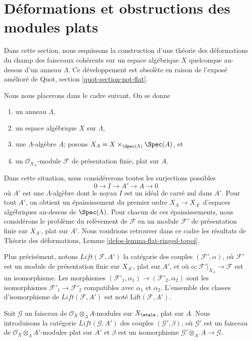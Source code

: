 \section{D\'eformations et obstructions des modules plats}
\label{section-modules}

\noindent
Dans cette section, nous esquissons la construction d'une th\'eorie des
d\'eformations du champ des faisceaux coh\'erents sur un espace alg\'ebrique
$X$ quelconque au-dessus d'un anneau $\Lambda$. Ce d\'eveloppement est
obsol\`ete en raison de l'expos\'e am\'elior\'e de
Quot, section \ref{quot-section-not-flat}.

\medskip\noindent
Nous nous placerons dans le cadre suivant. On se donne
\begin{enumerate}
\item un anneau $\Lambda$,
\item un espace alg\'ebrique $X$ sur $\Lambda$,
\item une $\Lambda$-alg\`ebre $A$; posons
$X_A = X \times_{\Spec(\Lambda)} \Spec(A)$, et
\item un $\mathcal{O}_{X_A}$-module $\mathcal{F}$ de pr\'esentation finie,
plat sur $A$.
\end{enumerate}
Dans cette situation, nous consid\'ererons toutes les surjections possibles
$$
0 \to I \to A' \to A \to 0
$$
o\`u $A'$ est une $\Lambda$-alg\`ebre dont le noyau $I$ est un id\'eal de carr\'e
nul dans $A'$. Pour tout $A'$, on obtient un \'epaississement du premier
ordre $X_A \to X_{A'}$ d'espaces alg\'ebriques au-dessus de
$\Spec(\Lambda)$. Pour chacun de ces \'epaississements, nous consid\'erons le
probl\`eme du rel\`evement de $\mathcal{F}$ en un module $\mathcal{F}'$ de
pr\'esentation finie sur $X_{A'}$, plat sur $A'$. Nous voudrions retrouver
dans ce cadre les r\'esultats de Th\'eorie des d\'eformations, Lemme
\ref{defos-lemma-flat-ringed-topoi}.

\medskip\noindent
Plus pr\'ecis\'ement, notons $\textit{Lift}(\mathcal{F}, A')$ la cat\'egorie
des couples $(\mathcal{F}', \alpha)$, o\`u $\mathcal{F}'$ est un module de
pr\'esentation finie sur $X_{A'}$, plat sur $A'$, et o\`u
$\alpha : \mathcal{F}'|_{X_A} \to \mathcal{F}$ est un isomorphisme.
Les morphismes $(\mathcal{F}'_1, \alpha_1) \to (\mathcal{F}'_2, \alpha_2)$
sont les isomorphismes $\mathcal{F}'_1 \to \mathcal{F}'_2$ compatibles avec
$\alpha_1$ et $\alpha_2$.
L'ensemble des classes d'isomorphisme de $\textit{Lift}(\mathcal{F}, A')$
est not\'e $\text{Lift}(\mathcal{F}, A')$.

\medskip\noindent
Soit $\mathcal{G}$ un faisceau de $\mathcal{O}_X \otimes_\Lambda A$-modules
sur $X_\etale$, plat sur $A$. Nous introduisons la cat\'egorie
$\textit{Lift}(\mathcal{G}, A')$ des couples
$(\mathcal{G}', \beta)$, o\`u $\mathcal{G}'$ est un faisceau de
$\mathcal{O}_X \otimes_\Lambda A'$-modules plat sur $A'$ et $\beta$
est un isomorphisme $\mathcal{G}' \otimes_{A'} A \to \mathcal{G}$.

